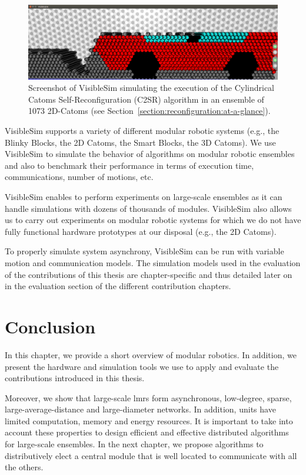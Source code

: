 \begin{figure}[!h]
	\centering
	\includegraphics[width=\linewidth]{images/context/visiblesim-c2sr.png}
	\caption{Screenshot of VisibleSim simulating the execution of the Cylindrical Catoms Self-Reconfiguration (C2SR) algorithm in an ensemble of 1073 2D-Catoms (see Section~\ref{section:reconfiguration:at-a-glance}).}
	\label{fig:context:visiblesim-catoms2D-c2sr}
\end{figure}

VisibleSim supports a variety of different modular robotic systems (e.g., the Blinky Blocks, the 2D Catoms, the Smart Blocks, the 3D Catoms). We use VisibleSim to simulate the behavior of algorithms on modular robotic ensembles and also to benchmark their performance in terms of execution time, communications, number of motions, etc. 

VisibleSim enables to perform experiments on large-scale ensembles as it can handle simulations with dozens of thousands of modules. VisibleSim also allows us to carry out experiments on modular robotic systems for which we do not have fully functional hardware prototypes at our disposal (e.g., the 2D Catoms).

To properly simulate system asynchrony, VisibleSim can be run with variable motion and communication models. The simulation models used in the evaluation of the contributions of this thesis are chapter-specific and thus detailed later on in the evaluation section of the different contribution chapters.

\section{Conclusion}

In this chapter, we provide a short overview of modular robotics. In addition, we present the hardware and simulation tools we use to apply and evaluate the contributions introduced in this thesis.

Moreover, we show that large-scale \gls{lmrs} form asynchronous, low-degree, sparse, large-average-distance and large-diameter networks. In addition, units have limited computation, memory and energy resources. It is important to take into account these properties to design efficient and effective distributed algorithms for large-scale ensembles. In the next chapter, we propose algorithms to distributively elect a central module that is well located to communicate with all the others.